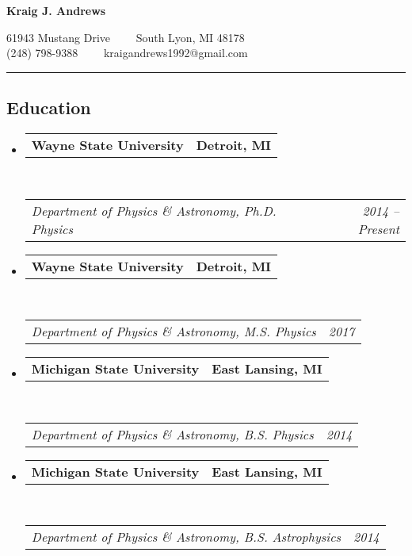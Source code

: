 \documentclass[10pt,letterpaper]{article}
\makeatletter
\newcommand{\headerrow}[2]
{\begin{tabular*}{\linewidth}{l@{\extracolsep{\fill}}r}
	#1 &
	#2 \\
\end{tabular*}}
\makeatother
\begin{document}
\begin{center}
{\LARGE \textbf{Kraig J. Andrews}}

61943 Mustang Drive\ \ \textbullet
\ \ South Lyon, MI 48178
\\
(248) 798-9388\ \ \textbullet
\ \ kraigandrews1992@gmail.com
\end{center}

\hrule
\vspace{-0.4em}
\subsection*{Education}

\begin{itemize}
	\parskip=0.1em

    \item 
    \headerrow
        {\textbf{Wayne State University}}
        {\textbf{Detroit, MI}}
    \\
    \headerrow
        {\emph{Department of Physics \& Astronomy, Ph.D. Physics}}
        {\emph{2014 -- Present}}
    
    \item 
    \headerrow
        {\textbf{Wayne State University}}
        {\textbf{Detroit, MI}}
    \\
    \headerrow
        {\emph{Department of Physics \& Astronomy, M.S. Physics}}
        {\emph{2017}}

	\item 
	\headerrow
		{\textbf{Michigan State University}}
		{\textbf{East Lansing, MI}}
	\\
	\headerrow
		{\emph{Department of Physics \& Astronomy, B.S. Physics}}
        {\emph{2014}}
    
    \item 
    \headerrow
        {\textbf{Michigan State University}}
        {\textbf{East Lansing, MI}}
    \\
    \headerrow
        {\emph{Department of Physics \& Astronomy, B.S. Astrophysics}}
        {\emph{2014}}

\end{itemize}
\end{document}
